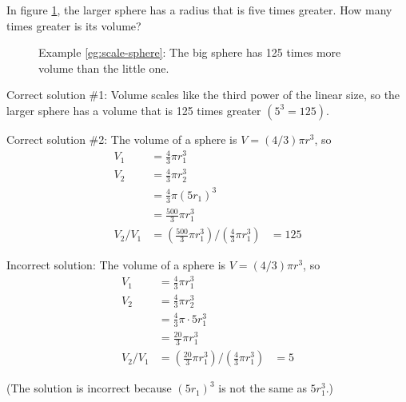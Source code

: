 \begin{exmp}
\label{eg:scale-sphere}
In figure \ref{eg-scale-sphere}, the larger sphere has a radius that
is five times greater. How many times greater is its volume?

\usetikzlibrary{calc,fadings,decorations.pathreplacing}




\begin{figure}
\begin{center}
\end{center}
\caption{ \qquad  \qquad  Example \ref{eg:scale-sphere}: 
 The big sphere has 125 times more
 volume than the little one.
 }
\label{eg-scale-sphere}
\end{figure}


\vspace{1.5mm}

Correct solution \#1: Volume scales like the third power of
the linear size, so the larger sphere has a volume that is
125 times greater $(5^3=125)$.

Correct solution \#2: The volume of a sphere is $V=(4/3)\pi r^3$, so
\begin{align*}
 V_1 &= \frac{4}{3}\pi r_1^3 \\
 V_2 &= \frac{4}{3}\pi r_2^3 \\
 &= \frac{4}{3}\pi (5r_1)^3 \\
 &= \frac{500}{3}\pi r_1^3 \\
 V_2/V_1 &= \left( \frac{500}{3}\pi r_1^3 \right) / \left( \frac{4}{3}\pi r_1^3 \right)
 &= 125
\end{align*}

Incorrect solution: The volume of a sphere is $V=(4/3)\pi r^3$, so
\begin{align*}
 V_1 &= \frac{4}{3}\pi r_1^3 \\
 V_2 &= \frac{4}{3}\pi r_2^3 \\
 &= \frac{4}{3}\pi \cdot 5r_1^3 \\
 &= \frac{20}{3}\pi r_1^3 \\
 V_2/V_1 &= \left( \frac{20}{3}\pi r_1^3 \right) / \left( \frac{4}{3}\pi r_1^3 \right)
 &= 5
\end{align*}

(The solution is incorrect because $(5r_1)^3$ is not the same as $5r_1^3$.)


\end{exmp}

